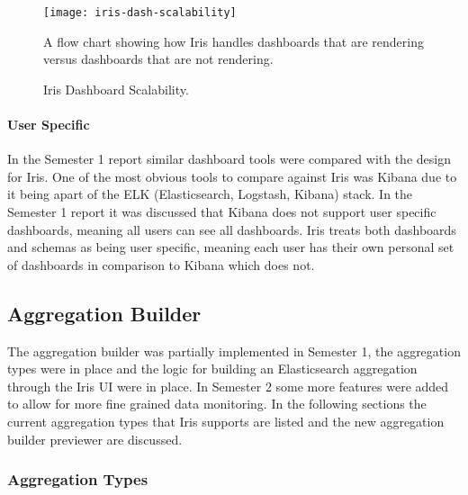 \documentclass[12pt,a4paper,titlepage]{report}
\begin{document}
\begin{figure}[H]
\begin{tcolorbox}
\begin{center}
\texttt{[image: iris-dash-scalability]}
\end{center}
A flow chart showing how Iris handles dashboards that are rendering versus dashboards that are not rendering.
\end{tcolorbox}
\caption{Iris Dashboard Scalability.}
\end{figure}

\paragraph{User Specific}
In the Semester 1 report similar dashboard tools were compared with the design for Iris. One of the most obvious tools to compare against Iris was Kibana due to it being apart of the ELK (Elasticsearch, Logstash, Kibana) stack. In the Semester 1 report it was discussed that Kibana does not support user specific dashboards, meaning all users can see all dashboards. Iris treats both dashboards and schemas as being user specific, meaning each user has their own personal set of dashboards in comparison to Kibana which does not.

\subsection{Aggregation Builder}
The aggregation builder was partially implemented in Semester 1, the aggregation types were in place and the logic for building an Elasticsearch aggregation through the Iris UI were in place. In Semester 2 some more features were added to allow for more fine grained data monitoring. In the following sections the current aggregation types that Iris supports are listed and the new aggregation builder previewer are discussed.

\subsubsection{Aggregation Types}
\end{document}
